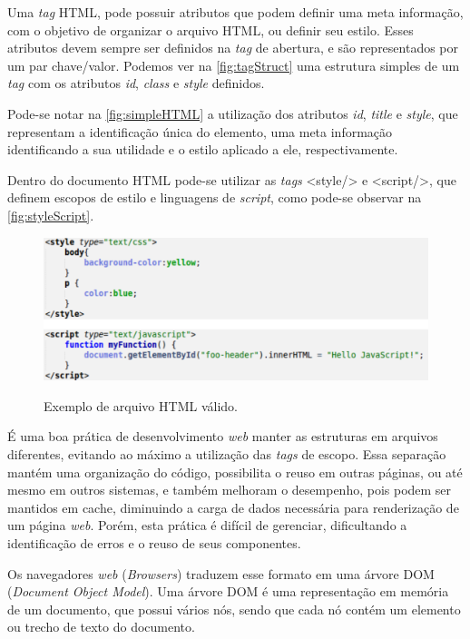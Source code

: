 Uma \textit{tag} HTML, pode possuir atributos que podem definir uma meta informação, com o objetivo de organizar o arquivo HTML, ou definir seu estilo. Esses atributos devem sempre ser definidos na \textit{tag} de abertura, e são representados por um par chave/valor. Podemos ver na \autoref{fig:tagStruct} uma estrutura simples de um \textit{tag} com os atributos \textit{id}, \textit{class} e \textit{style} definidos.

Pode-se notar na \autoref{fig:simpleHTML} a utilização dos atributos \textit{id}, \textit{title} e \textit{style}, que representam a identificação única do elemento, uma meta informação identificando a sua utilidade e o estilo aplicado a ele, respectivamente.

Dentro do documento HTML pode-se utilizar as \textit{tags} <style/> e <script/>, que definem escopos de estilo e linguagens de \textit{script}, como pode-se observar na \autoref{fig:styleScript}.

\begin{figure}[!htb]
	\centering
	\caption{Exemplo de arquivo HTML válido.}
	\includegraphics[width=1\textwidth]{./04-figuras/style_script}
	\label{fig:styleScript}
\end{figure}

É uma boa prática de desenvolvimento \textit{web} manter as estruturas em arquivos diferentes, evitando ao máximo a utilização das \textit{tags} de escopo. Essa separação mantém uma organização do código, possibilita o reuso em outras páginas, ou até mesmo em outros sistemas, e também melhoram o desempenho, pois podem ser mantidos em cache, diminuindo a carga de dados necessária para renderização de um página \textit{web}. Porém, esta prática é difícil de gerenciar, dificultando a identificação de erros e o reuso de seus componentes.

Os navegadores \textit{web} (\textit{Browsers}) traduzem esse formato em uma árvore DOM (\textit{Document Object Model}). Uma árvore DOM é uma representação em memória de um documento, que possui vários nós, sendo que cada nó contém um elemento ou trecho de texto do documento.

